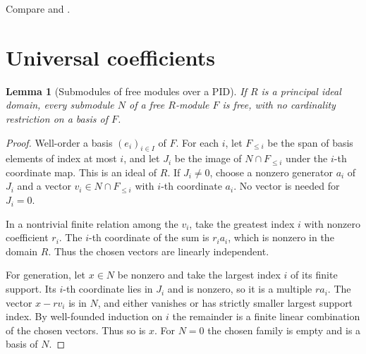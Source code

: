 \documentclass[11pt,oneside,openany]{book}
\newtheorem{lemma}[theorem]{Lemma}
\theoremstyle{definition}
\theoremstyle{remark}
\begin{document}
Compare \cite[Theorem 3.4.3 and Corollary 3.4.5]{weibel} and
\cite[Theorems 7.30--7.35]{rotman}.

\section{Universal coefficients}

\begin{lemma}[Submodules of free modules over a PID]
\label{p103:pid-submodule-arbitrary}
If \(R\) is a principal ideal domain, every submodule \(N\) of a
free \(R\)-module \(F\) is free, with no cardinality restriction on
a basis of \(F\).
\end{lemma}
\begin{proof}
Well-order a basis \((e_i)_{i\in I}\) of \(F\). For each \(i\),
let \(F_{\le i}\) be the span of basis elements of index at most
\(i\), and let \(J_i\) be the image of \(N\cap F_{\le i}\)
under the \(i\)-th coordinate map. This is an ideal of \(R\).
If \(J_i\ne0\), choose a nonzero generator \(a_i\) of \(J_i\)
and a vector \(v_i\in N\cap F_{\le i}\) with \(i\)-th coordinate
\(a_i\). No vector is needed for \(J_i=0\).

In a nontrivial finite relation among the \(v_i\), take the
greatest index \(i\) with nonzero coefficient \(r_i\).
The \(i\)-th coordinate of the sum is \(r_i a_i\), which is
nonzero in the domain \(R\). Thus the chosen vectors are
linearly independent.

For generation, let \(x\in N\) be nonzero and take the largest
index \(i\) of its finite support. Its \(i\)-th coordinate lies
in \(J_i\) and is nonzero, so it is a multiple \(r a_i\).
The vector \(x-rv_i\) is in \(N\), and either vanishes or has
strictly smaller largest support index. By well-founded induction
on \(i\) the remainder is a finite linear combination of the
chosen vectors. Thus so is \(x\). For \(N=0\) the chosen family is
empty and is a basis of \(N\).
\end{proof}
\end{document}
